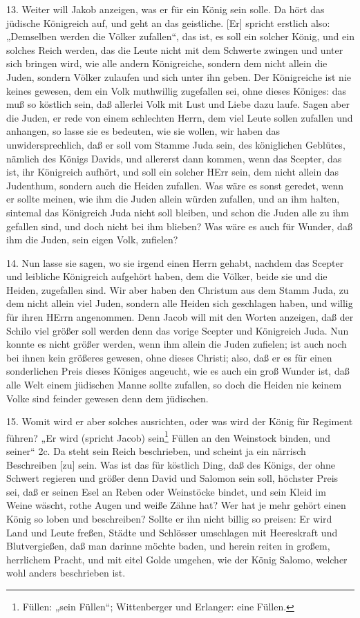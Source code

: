 13. Weiter will Jakob anzeigen, was er für ein König sein solle. Da hört das jüdische Königreich auf, und geht an das geistliche. [Er] spricht erstlich also: „Demselben werden die Völker zufallen“, das ist, es soll ein solcher König, und ein solches Reich werden, das die Leute nicht mit dem Schwerte zwingen und unter sich bringen wird, wie alle andern Königreiche, sondern dem nicht allein die Juden, sondern Völker zulaufen und sich unter ihn geben. Der Königreiche ist nie keines gewesen, dem ein Volk muthwillig zugefallen sei, ohne dieses Königes: das muß so köstlich sein, daß allerlei Volk mit Lust und Liebe dazu laufe. Sagen aber die Juden, er rede von einem schlechten Herrn, dem viel Leute
sollen zufallen und anhangen, so lasse sie es bedeuten, wie sie wollen, wir haben das unwidersprechlich, daß er soll vom Stamme Juda sein, des königlichen Geblütes, nämlich des Königs Davids, und allererst dann kommen, wenn das Scepter, das ist, ihr Königreich aufhört, und soll ein solcher HErr sein, dem nicht allein das Judenthum, sondern auch die Heiden zufallen. Was wäre es sonst geredet, wenn er sollte meinen, wie ihm die Juden allein würden zufallen, und an ihm halten, sintemal das Königreich Juda nicht soll bleiben, und schon die Juden alle zu ihm gefallen sind, und doch nicht bei ihm blieben? Was wäre es auch für Wunder, daß ihm die Juden, sein eigen Volk, zufielen?

14. Nun lasse sie sagen, wo sie irgend einen Herrn gehabt, nachdem das Scepter und leibliche Königreich aufgehört haben, dem die Völker, beide sie und die Heiden, zugefallen sind. Wir aber haben den Christum aus dem Stamm Juda, zu dem nicht allein viel Juden, sondern alle Heiden sich geschlagen haben, und willig für ihren HErrn angenommen. Denn Jacob will mit den Worten anzeigen, daß der Schilo viel größer soll werden denn das vorige Scepter und Königreich Juda. Nun konnte es nicht größer werden, wenn ihm allein die Juden zufielen; ist auch noch bei ihnen kein größeres gewesen, ohne dieses Christi; also, daß er es für einen sonderlichen Preis dieses Königes angeucht, wie es auch ein groß Wunder ist, daß alle Welt einem jüdischen Manne sollte zufallen, so doch die Heiden nie keinem Volke sind feinder gewesen denn dem jüdischen.

15. Womit wird er aber solches ausrichten, oder was wird der König für Regiment führen? „Er wird (spricht Jacob) sein\footnote{Füllen: „sein Füllen“; Wittenberger und Erlanger: eine Füllen.} Füllen an den Weinstock binden, und seiner“ 2c. Da steht sein Reich beschrieben, und scheint ja ein närrisch Beschreiben [zu] sein. Was ist das für köstlich Ding, daß des Königs, der ohne Schwert regieren und größer denn David und Salomon sein soll, höchster Preis sei, daß er seinen Esel an Reben oder Weinstöcke bindet, und sein Kleid im Weine wäscht, rothe Augen und weiße Zähne hat? Wer hat je mehr gehört einen König so loben und beschreiben? Sollte er ihn nicht billig so preisen: Er wird Land und Leute freßen, Städte und Schlösser umschlagen mit Heereskraft und Blutvergießen, daß man darinne möchte baden, und herein reiten in großem, herrlichem Pracht, und mit eitel Golde umgehen, wie der König Salomo, welcher wohl anders beschrieben ist.

